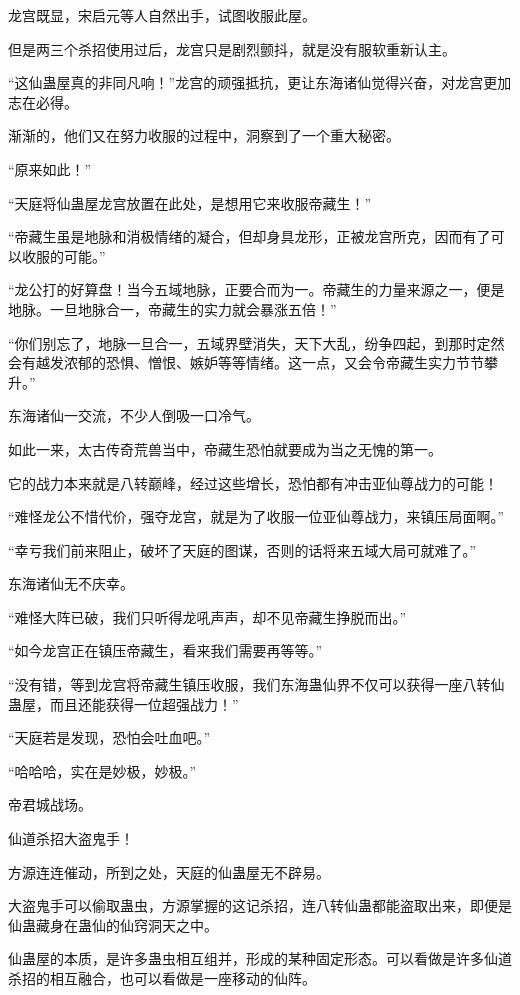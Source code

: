 \begin{this_body}
龙宫既显，宋启元等人自然出手，试图收服此屋。

但是两三个杀招使用过后，龙宫只是剧烈颤抖，就是没有服软重新认主。

“这仙蛊屋真的非同凡响！”龙宫的顽强抵抗，更让东海诸仙觉得兴奋，对龙宫更加志在必得。

渐渐的，他们又在努力收服的过程中，洞察到了一个重大秘密。

“原来如此！”

“天庭将仙蛊屋龙宫放置在此处，是想用它来收服帝藏生！”

“帝藏生虽是地脉和消极情绪的凝合，但却身具龙形，正被龙宫所克，因而有了可以收服的可能。”

“龙公打的好算盘！当今五域地脉，正要合而为一。帝藏生的力量来源之一，便是地脉。一旦地脉合一，帝藏生的实力就会暴涨五倍！”

“你们别忘了，地脉一旦合一，五域界壁消失，天下大乱，纷争四起，到那时定然会有越发浓郁的恐惧、憎恨、嫉妒等等情绪。这一点，又会令帝藏生实力节节攀升。”

东海诸仙一交流，不少人倒吸一口冷气。

如此一来，太古传奇荒兽当中，帝藏生恐怕就要成为当之无愧的第一。

它的战力本来就是八转巅峰，经过这些增长，恐怕都有冲击亚仙尊战力的可能！

“难怪龙公不惜代价，强夺龙宫，就是为了收服一位亚仙尊战力，来镇压局面啊。”

“幸亏我们前来阻止，破坏了天庭的图谋，否则的话将来五域大局可就难了。”

东海诸仙无不庆幸。

“难怪大阵已破，我们只听得龙吼声声，却不见帝藏生挣脱而出。”

“如今龙宫正在镇压帝藏生，看来我们需要再等等。”

“没有错，等到龙宫将帝藏生镇压收服，我们东海蛊仙界不仅可以获得一座八转仙蛊屋，而且还能获得一位超强战力！”

“天庭若是发现，恐怕会吐血吧。”

“哈哈哈，实在是妙极，妙极。”

帝君城战场。

仙道杀招大盗鬼手！

方源连连催动，所到之处，天庭的仙蛊屋无不辟易。

大盗鬼手可以偷取蛊虫，方源掌握的这记杀招，连八转仙蛊都能盗取出来，即便是仙蛊藏身在蛊仙的仙窍洞天之中。

仙蛊屋的本质，是许多蛊虫相互组并，形成的某种固定形态。可以看做是许多仙道杀招的相互融合，也可以看做是一座移动的仙阵。


\end{this_body}
